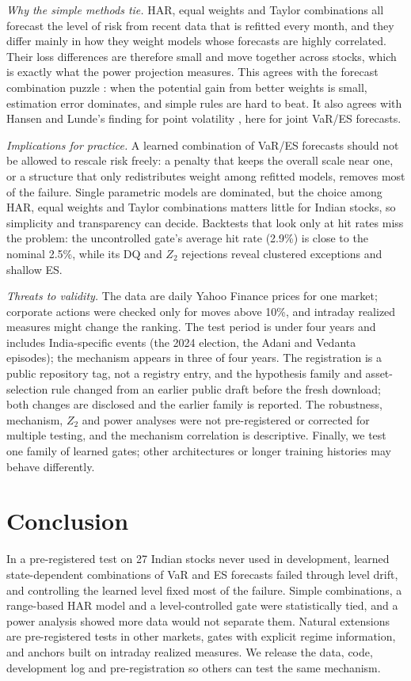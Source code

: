 \documentclass[conference]{IEEEtran}
\begin{document}
\textit{Why the simple methods tie.} HAR, equal weights and Taylor combinations all forecast the level of risk from recent data that is refitted every month, and they differ mainly in how they weight models whose forecasts are highly correlated. Their loss differences are therefore small and move together across stocks, which is exactly what the power projection measures. This agrees with the forecast combination puzzle \cite{stock2004,smith2009,claeskens2016,elliott2026}: when the potential gain from better weights is small, estimation error dominates, and simple rules are hard to beat. It also agrees with Hansen and Lunde's finding for point volatility \cite{hansen2005}, here for joint VaR/ES forecasts.

\textit{Implications for practice.} A learned combination of VaR/ES forecasts should not be allowed to rescale risk freely: a penalty that keeps the overall scale near one, or a structure that only redistributes weight among refitted models, removes most of the failure. Single parametric models are dominated, but the choice among HAR, equal weights and Taylor combinations matters little for Indian stocks, so simplicity and transparency can decide. Backtests that look only at hit rates miss the problem: the uncontrolled gate's average hit rate (2.9\%) is close to the nominal 2.5\%, while its DQ and $Z_2$ rejections reveal clustered exceptions and shallow ES.

\textit{Threats to validity.} The data are daily Yahoo Finance prices for one market; corporate actions were checked only for moves above 10\%, and intraday realized measures might change the ranking. The test period is under four years and includes India-specific events (the 2024 election, the Adani and Vedanta episodes); the mechanism appears in three of four years. The registration is a public repository tag, not a registry entry, and the hypothesis family and asset-selection rule changed from an earlier public draft before the fresh download; both changes are disclosed and the earlier family is reported. The robustness, mechanism, $Z_2$ and power analyses were not pre-registered or corrected for multiple testing, and the mechanism correlation is descriptive. Finally, we test one family of learned gates; other architectures or longer training histories may behave differently.

\section{Conclusion}

In a pre-registered test on 27 Indian stocks never used in development, learned state-dependent combinations of VaR and ES forecasts failed through level drift, and controlling the learned level fixed most of the failure. Simple combinations, a range-based HAR model and a level-controlled gate were statistically tied, and a power analysis showed more data would not separate them. Natural extensions are pre-registered tests in other markets, gates with explicit regime information, and anchors built on intraday realized measures. We release the data, code, development log and pre-registration so others can test the same mechanism.

\balance


\end{document}
